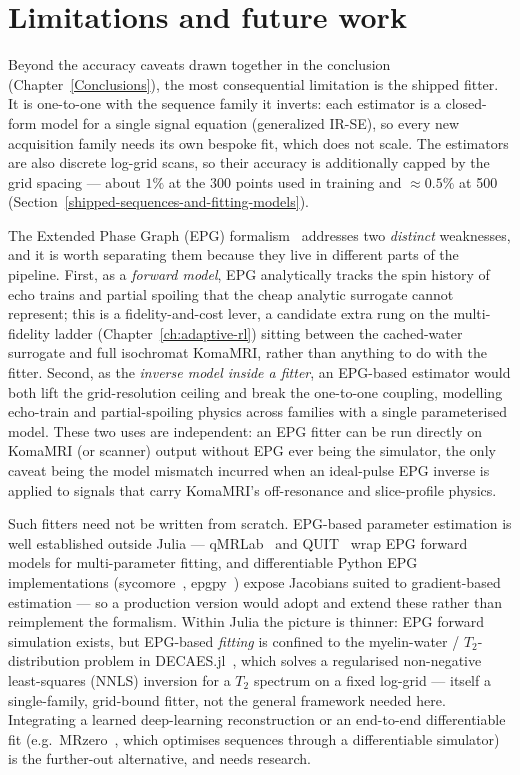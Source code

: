 \section{Limitations and future work}
\label{sec:twin-limitations}

Beyond the accuracy caveats drawn together in the conclusion
(Chapter~\ref{Conclusions}), the most consequential limitation is the shipped
fitter. It is one-to-one with the sequence family it inverts: each estimator is
a closed-form model for a single signal equation (generalized IR-SE), so every
new acquisition family needs its own bespoke fit, which does not scale. The
estimators are also discrete log-grid scans, so their accuracy is additionally
capped by the grid spacing --- about $1\%$ at the 300 points used in training
and ${\approx}0.5\%$ at 500
(Section~\ref{shipped-sequences-and-fitting-models}).

The Extended Phase Graph (EPG) formalism~\cite{weigel2015epg} addresses two
\emph{distinct} weaknesses, and it is worth separating them because they live in
different parts of the pipeline. First, as a \emph{forward model}, EPG analytically
tracks the spin history of echo trains and partial spoiling that the cheap analytic
surrogate cannot represent; this is a fidelity-and-cost lever, a candidate extra
rung on the multi-fidelity ladder (Chapter~\ref{ch:adaptive-rl}) sitting between
the cached-water surrogate and full isochromat KomaMRI, rather than anything to do
with the fitter. Second, as the \emph{inverse model inside a fitter}, an EPG-based
estimator would both lift the grid-resolution ceiling and break the one-to-one
coupling, modelling echo-train and partial-spoiling physics across families with a
single parameterised model. These two uses are independent: an EPG fitter can be
run directly on KomaMRI (or scanner) output without EPG ever being the simulator,
the only caveat being the model mismatch incurred when an ideal-pulse EPG inverse
is applied to signals that carry KomaMRI's off-resonance and slice-profile physics.

Such fitters need not be written from scratch. EPG-based parameter estimation is
well established outside Julia --- qMRLab~\cite{qmrlab} and QUIT~\cite{quit} wrap
EPG forward models for multi-parameter fitting, and differentiable Python EPG
implementations (sycomore~\cite{sycomore}, epgpy~\cite{epgpy}) expose Jacobians
suited to gradient-based estimation --- so a production version would adopt and
extend these rather than reimplement the formalism. Within Julia the picture is
thinner: EPG forward simulation exists, but EPG-based \emph{fitting} is confined to
the myelin-water / $T_2$-distribution problem in DECAES.jl~\cite{decaes}, which
solves a regularised non-negative least-squares (NNLS) inversion for a $T_2$
spectrum on a fixed log-grid --- itself a single-family, grid-bound fitter, not the
general framework needed here. Integrating a learned deep-learning reconstruction
or an end-to-end differentiable fit (e.g.\ MRzero~\cite{MRISeqSupLearning:21}, which
optimises sequences through a differentiable simulator) is the further-out
alternative, and needs research.

